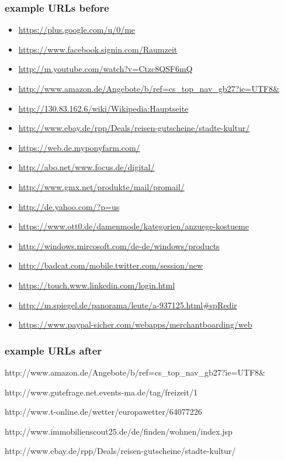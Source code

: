 \subsubsection{example URLs before}
\label{example_urls_before}
\begin{itemize}
\item \url{https://plus.google.com/u/0/me}
\item \url{https://www.facebook.signin.com/Raumzeit}
\item \url{http://m.youtube.com/watch?v=Ctzc8QSF6mQ}
\item \url{http://www.amazon.de/Angebote/b/ref=cs_top_nav_gb27?ie=UTF8&}
\item \url{http://130.83.162.6/wiki/Wikipedia:Hauptseite}
\item \url{http://www.ebay.de/rpp/Deals/reisen-gutscheine/stadte-kultur/}
\item \url{https://web.de.myponyfarm.com/}
\item \url{http://abo.net/www.focus.de/digital/}
\item \url{http://www.gmx.net/produkte/mail/promail/}
\item \url{http://de.yahoo.com/?p=us}
\item \url{https://www.ott0.de/damenmode/kategorien/anzuege-kostueme}
\item \url{http://windows.mircosoft.com/de-de/windows/products}
\item \url{http://badcat.com/mobile.twitter.com/session/new}
\item \url{https://touch.www.linkedin.com/login.html}
\item \url{http://m.spiegel.de/panorama/leute/a-937125.html#spRedir}
\item \url{https://www.paypal-sicher.com/webapps/merchantboarding/web}
\end{itemize}


\subsubsection{example URLs after}
\label{example_urls_after}


http://www.amazon.de/Angebote/b/ref=cs_top_nav_gb27?ie=UTF8&

http://www.gutefrage.net.events-ma.de/tag/freizeit/1

http://www.t-online.de/wetter/europawetter/64077226

http://www.immobilienscout25.de/de/finden/wohnen/index.jsp

http://www.ebay.de/rpp/Deals/reisen-gutscheine/stadte-kultur/


